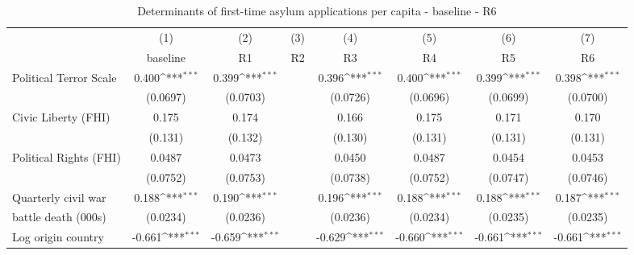 \begin{table}[htbp]\centering
	 \scriptsize
	 	\def\sym#1{\ifmmode^{#1}\else\(^{#1}\)\fi}
	\caption{Determinants of first-time asylum applications per capita - baseline - R6}
	\begin{tabular}{l*{7}{c}}
		\hline\hline
	&\multicolumn{1}{c}{(1)}     &\multicolumn{1}{c}{(2)}       &\multicolumn{1}{c}{(3)}       &\multicolumn{1}{c}{(4)}    	&\multicolumn{1}{c}{(5)}  	&\multicolumn{1}{c}{(6)}   &\multicolumn{1}{c}{(7)} \\
	&\multicolumn{1}{c}{baseline}     &\multicolumn{1}{c}{R1}       &\multicolumn{1}{c}{R2}       &\multicolumn{1}{c}{R3}    	&\multicolumn{1}{c}{R4}  	&\multicolumn{1}{c}{R5}   &\multicolumn{1}{c}{R6}         	\\
\hline
Political Terror Scale&       0.400\sym{***}&       0.399\sym{***}&                     &       0.396\sym{***}&       0.400\sym{***}&       0.399\sym{***}&       0.398\sym{***}\\
                    &    (0.0697)         &    (0.0703)         &                     &    (0.0726)         &    (0.0696)         &    (0.0699)         &    (0.0700)         \\
[0,5em]
Civic Liberty (FHI) &       0.175         &       0.174         &                     &       0.166         &       0.175         &       0.171         &       0.170         \\
                    &     (0.131)         &     (0.132)         &                     &     (0.130)         &     (0.131)         &     (0.131)         &     (0.131)         \\
[0,5em]
Political Rights (FHI)&      0.0487         &      0.0473         &                     &      0.0450         &      0.0487         &      0.0454         &      0.0453         \\
                    &    (0.0752)         &    (0.0753)         &                     &    (0.0738)         &    (0.0752)         &    (0.0747)         &    (0.0746)         \\
[0,5em]
Quarterly civil war&       0.188\sym{***}&       0.190\sym{***}&                     &       0.196\sym{***}&       0.188\sym{***}&       0.188\sym{***}&       0.187\sym{***}\\
 battle death (000s)                    &    (0.0234)         &    (0.0236)         &                     &    (0.0236)         &    (0.0234)         &    (0.0235)         &    (0.0235)         \\
[0,5em]
Log origin country &      -0.661\sym{***}&      -0.659\sym{***}&                     &      -0.629\sym{***}&      -0.660\sym{***}&      -0.661\sym{***}&      -0.661\sym{***}\\

\end{tabular}
\end{table}
